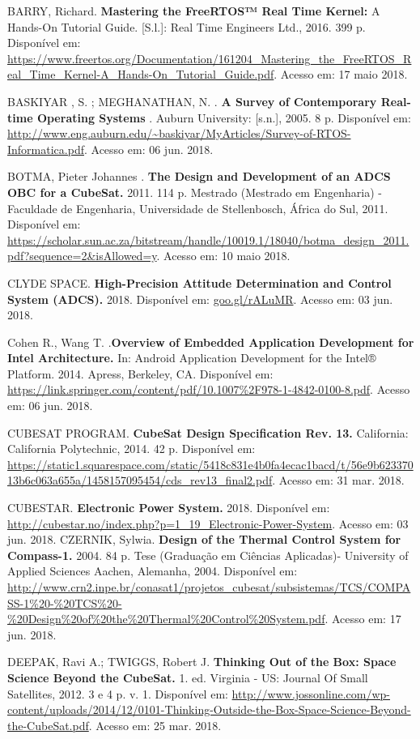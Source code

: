 \noindent BARRY, Richard. \textbf{Mastering the FreeRTOS™ Real Time Kernel:} A Hands-On Tutorial Guide. [S.l.]: Real Time Engineers Ltd., 2016. 399 p. Disponível em: \url{https://www.freertos.org/Documentation/161204_Mastering_the_FreeRTOS_Real_Time_Kernel-A_Hands-On_Tutorial_Guide.pdf}. Acesso em: 17 maio 2018.

\noindent BASKIYAR , S. ; MEGHANATHAN, N. . \textbf{A Survey of Contemporary Real-time Operating Systems} . Auburn University: [s.n.], 2005. 8 p. Disponível em: \url{http://www.eng.auburn.edu/~baskiyar/MyArticles/Survey-of-RTOS-Informatica.pdf}. Acesso em: 06 jun. 2018.

\noindent BOTMA, Pieter Johannes . \textbf{The Design and Development of an ADCS OBC for a CubeSat. } 2011. 114 p. Mestrado (Mestrado em Engenharia) - Faculdade de Engenharia, Universidade de Stellenbosch, África do Sul, 2011. Disponível em: \url{https://scholar.sun.ac.za/bitstream/handle/10019.1/18040/botma_design_2011.pdf?sequence=2&isAllowed=y}. Acesso em: 10 maio 2018.

\noindent CLYDE SPACE. \textbf{High-Precision Attitude Determination and Control System (ADCS). } 2018. Disponível em: \url{goo.gl/rALuMR}. Acesso em: 03 jun. 2018.

\noindent Cohen R., Wang T. .\textbf{Overview of Embedded Application Development for Intel Architecture.} In: Android Application Development for the Intel® Platform. 2014. Apress, Berkeley, CA. Disponível em: \url{https://link.springer.com/content/pdf/10.1007\%2F978-1-4842-0100-8.pdf}. Acesso em: 06 jun. 2018.

\noindent CUBESAT PROGRAM. \textbf{CubeSat Design Specification Rev. 13. } California: California Polytechnic, 2014. 42 p. Disponível em: \url{https://static1.squarespace.com/static/5418c831e4b0fa4ecac1bacd/t/56e9b62337013b6c063a655a/1458157095454/cds_rev13_final2.pdf}. Acesso em: 31 mar. 2018.

\noindent CUBESTAR. \textbf{Electronic Power System. } 2018. Disponível em: \url{http://cubestar.no/index.php?p=1_19_Electronic-Power-System}. Acesso em: 03 jun. 2018.
\noindent CZERNIK, Sylwia. \textbf{Design of the Thermal Control System for Compass-1. } 2004. 84 p. Tese (Graduação em Ciências Aplicadas)- University of Applied Sciences Aachen, Alemanha, 2004. Disponível em: \url{http://www.crn2.inpe.br/conasat1/projetos_cubesat/subsistemas/TCS/COMPASS-1\%20-\%20TCS\%20-\%20Design\%20of\%20the\%20Thermal\%20Control\%20System.pdf}. Acesso em: 17 jun. 2018.

\noindent DEEPAK, Ravi A.; TWIGGS, Robert J. \textbf{Thinking Out of the Box: Space Science Beyond the CubeSat. } 1. ed. Virginia - US: Journal Of Small Satellites, 2012. 3 e 4 p. v. 1. Disponível em: \url{http://www.jossonline.com/wp-content/uploads/2014/12/0101-Thinking-Outside-the-Box-Space-Science-Beyond-the-CubeSat.pdf}. Acesso em: 25 mar. 2018.

